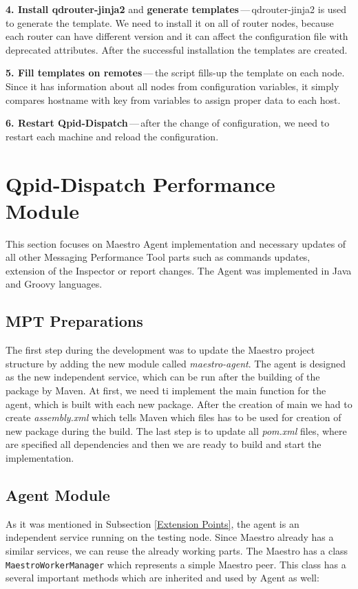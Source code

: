 \begin{description}
	\item \textbf{4. Install qdrouter-jinja2} and \textbf{generate templates}\,---\,qdrouter-jinja2 is used to generate the template. We need to install it on all of router nodes, because each router can have different version and it can affect the configuration file with deprecated attributes. After the successful installation the templates are created.
	\item \textbf{5. Fill templates on remotes}\,---\,the script fills-up the template on each node. Since it has information about all nodes from configuration variables, it simply compares hostname with key from variables to assign proper data to each host.
	\item \textbf{6. Restart Qpid-Dispatch}\,---\,after the change of configuration, we need to restart each machine and reload the configuration.
\end{description}

\section{Qpid-Dispatch Performance Module}
This section focuses on Maestro Agent implementation and necessary updates of all other Messaging Performance Tool parts such as commands updates, extension of the Inspector or report changes. The Agent was implemented in Java and Groovy languages.

\subsection{MPT Preparations}
\label{MPT Preparations}
The first step during the development was to update the Maestro project structure by adding the new module called \emph{maestro-agent}. The agent is designed as the new independent service, which can be run after the building of the package by Maven. At first, we need ti implement the main function for the agent, which is built with each new package. After the creation of main we had to create \emph{assembly.xml} which tells Maven which files has to be used for creation of new package during the build. The last step is to update all \emph{pom.xml} files, where are specified all dependencies and then we are ready to build and start the implementation.

\subsection{Agent Module}
As it was mentioned in Subsection \ref{Extension Points}, the agent is an independent service running on the testing node. Since Maestro already has a similar services, we can reuse the already working parts. The Maestro has a class \texttt{MaestroWorkerManager} which represents a simple Maestro peer. This class has a several important methods which are inherited and used by Agent as well:

